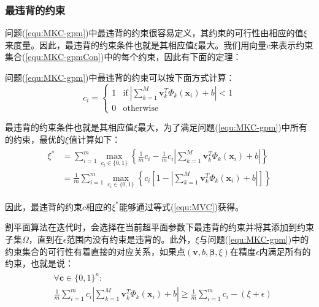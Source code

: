 \subsubsection{最违背的约束}
问题(\ref{equ:MKC-gpm})中最违背的约束很容易定义，其约束的可行性由相应的值$\xi$来度量。因此，最违背的约束条件也就是其相应值$\xi$最大。我们用向量$c$来表示约束集合(\ref{equ:MKC-gpmCon})中的每个约束，因此有下面的定理：
\begin{theorem}
\rm 问题(\ref{equ:MKC-gpm})中最违背的约束可以按下面方式计算：
\begin{equation}
c_i=
\begin{cases}
1 & \mathrm{if}\ \left |\sum^M_{k=1}\mathbf{v}_k^T\Phi_k(\mathbf{x}_i)+b \right | < 1 \\
0 & \mathrm{otherwise}
\end{cases}
\label{equ:MVC}
\end{equation}
\label{theorem:MKC2}
\end{theorem}
\hspace{24pt}{\heiti 证明}\hspace{1em}最违背的约束条件也就是其相应值$\xi$最大，为了满足问题(\ref{equ:MKC-gpm})中所有的约束，最优的$\xi$值计算如下：
\begin{align}
\begin{split}
\xi^* & = \sum^m_{i=1}\max_{c_i\in\{0,1\}}\left\{\frac{1}{m}c_i - \frac{1}{m}c_i\left | \sum^M_{k=1}\mathbf{v}_k^T\Phi_k(\mathbf{x}_i)+b \right | \right \} \\
& = \frac{1}{m}\sum^m_{i=1}\max_{c_i\in\{0,1\}}\left\{ c_i \left [ 1 - \left | \sum^M_{k=1}\mathbf{v}_k^T\Phi_k(\mathbf{x}_i)+b \right | \right ] \right \} 
\end{split}
\end{align}

因此，最违背的约束$c$相应的$\xi^*$能够通过等式(\ref{equ:MVC})获得。

割平面算法在迭代时，会选择在当前超平面参数下最违背的约束并将其添加到约束子集$\Omega$，直到在$\epsilon$范围内没有约束是违背的。此外，$\xi$与问题(\ref{equ:MKC-gpm})中的约束集合的可行性有着直接的对应关系，如果点$(\mathbf{v},b,\mathbf{\beta},\xi)$在精度$\epsilon$内满足所有的约束，也就是说：
\begin{align}
\begin{split}
& \forall \mathbf{c} \in \{0,1\}^n: \\
& \frac{1}{m}\sum^m_{i=1}c_i\left | \sum^M_{k=1}\mathbf{v}_k^T\Phi_k(\mathbf{x}_i)+b \right | \ge \frac{1}{m}\sum^m_{i=1}c_i - (\xi + \epsilon)
\label{equ:feasi}
\end{split}
\end{align}

